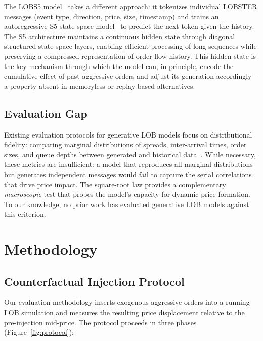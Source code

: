 \documentclass[sigplan,screen,anonymous]{acmart}
\begin{document}
The LOBS5 model~\cite{nagy2023generative} takes a different approach: it tokenizes individual LOBSTER messages (event type, direction, price, size, timestamp) and trains an autoregressive S5 state-space model~\cite{smith2023s5, gu2021efficiently} to predict the next token given the history. The S5 architecture maintains a continuous hidden state through diagonal structured state-space layers, enabling efficient processing of long sequences while preserving a compressed representation of order-flow history. This hidden state is the key mechanism through which the model can, in principle, encode the cumulative effect of past aggressive orders and adjust its generation accordingly---a property absent in memoryless or replay-based alternatives.

\subsection{Evaluation Gap}

Existing evaluation protocols for generative LOB models focus on distributional fidelity: comparing marginal distributions of spreads, inter-arrival times, order sizes, and queue depths between generated and historical data~\cite{cont2001empirical}. While necessary, these metrics are insufficient: a model that reproduces all marginal distributions but generates independent messages would fail to capture the serial correlations that drive price impact. The square-root law provides a complementary \emph{macroscopic} test that probes the model's capacity for dynamic price formation. To our knowledge, no prior work has evaluated generative LOB models against this criterion.


\section{Methodology}
\label{sec:methodology}

\subsection{Counterfactual Injection Protocol}
\label{sec:injection}

Our evaluation methodology inserts exogenous aggressive orders into a running LOB simulation and measures the resulting price displacement relative to the pre-injection mid-price. The protocol proceeds in three phases (Figure~\ref{fig:protocol}):
\end{document}
